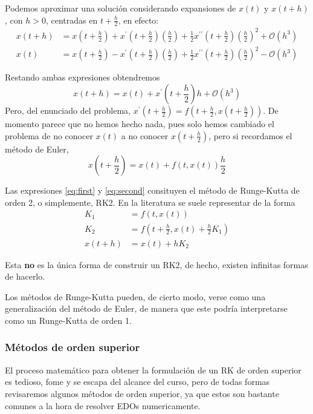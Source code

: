 Podemos aproximar una solución considerando expansiones de $x(t)$ y $x(t+ h)$, con $h > 0$, centradas en $t + \frac{h}{2}$, en efecto:
\begin{align*}
  x(t + h) &= x(t + \frac{h}{2}) + x^{\prime}(t + \frac{h}{2}) \left(\frac{h}{2} \right) + \frac{1}{2}x^{\prime \prime}(t + \frac{h}{2})\left( \frac{h}{2} \right)^{2} + \mathcal{O}(h^{3}) \\
  x(t) &= x(t + \frac{h}{2}) - x^{\prime}(t + \frac{h}{2}) \left(\frac{h}{2} \right) + \frac{1}{2}x^{\prime \prime}(t + \frac{h}{2})\left( \frac{h}{2} \right)^{2} - \mathcal{O}(h^{3})
\end{align*}

Restando ambas expresiones obtendremos
\begin{equation} \label{eq:second}
  x(t + h) = x(t) + x^{\prime}(t + \frac{h}{2}) h + \mathcal{O}(h^{3})
 \end{equation}
Pero, del enunciado del problema, $x^{\prime}(t + \frac{h}{2}) = f(t + \frac{h}{2}, x(t + \frac{h}{2}))$. De momento parece que no hemos hecho nada, pues solo hemos cambiado el problema de no conocer $x(t)$ a no conocer $x(t + \frac{h}{2})$, pero si recordamos el método de Euler,
\begin{equation} \label{eq:first}
  x(t + \frac{h}{2}) = x(t) + f(t, x(t))\frac{h}{2}
 \end{equation}

Las expresiones \eqref{eq:first} y \eqref{eq:second} consituyen el método de Runge-Kutta de orden 2, o simplemente, RK2. En la literatura se suele representar de la forma
\begin{align}
  K_{1} &= f(t, x(t)) \\
  K_{2} &= f(t + \frac{h}{2}, x(t) + \frac{h}{2}K_{1}) \\
  x(t + h) &= x(t) + hK_{2}
\end{align}

Esta \textbf{no} es la única forma de construir un RK2, de hecho, existen infinitas formas de hacerlo.

Los métodos de Runge-Kutta pueden, de cierto modo, verse como una generalización del método de Euler, de manera que este podría interpretarse como un Runge-Kutta de orden 1. 

\subsubsection{Métodos de orden superior}
  El proceso matemático para obtener la formulación de un RK de orden superior es tedioso, fome y se escapa del alcance del curso, pero de todas formas revisaremos algunos métodos de orden superior, ya que estos son bastante comunes a la hora de resolver EDOs numericamente.

